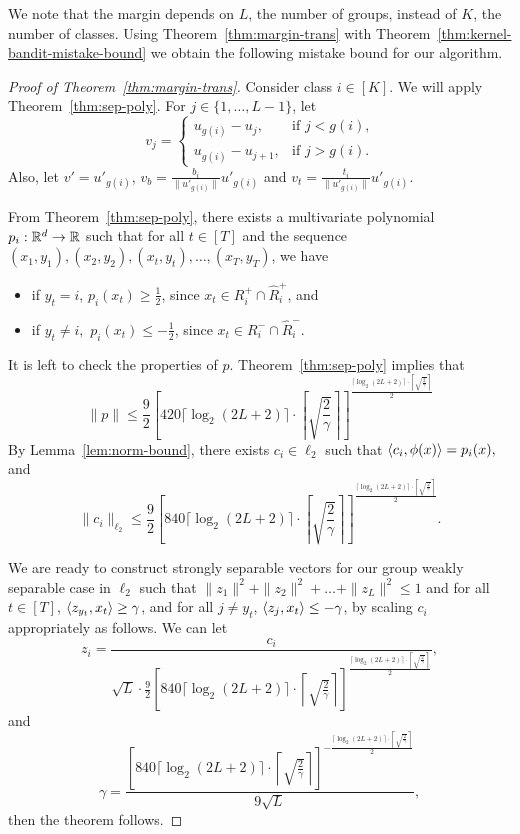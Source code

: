 We note that the margin depends on $L$, the number of groups, instead of $K$, the number of classes.  Using Theorem~\ref{thm:margin-trans} with Theorem~\ref{thm:kernel-bandit-mistake-bound} we obtain the following mistake bound for our algorithm.

\begin{proof}[Proof of Theorem~\ref{thm:margin-trans}]

Consider class $i\in[K]$. We will apply
Theorem~\ref{thm:sep-poly}. For $j\in\{1,\ldots,L-1\}$, let
\[
v_j=\left\{
\begin{array}{ll}
    u_{g(i)}-u_j, & \mbox{if $j<g(i)$,} \\
    u_{g(i)}-u_{j+1}, & \mbox{if $j>g(i)$.}
\end{array}
\right.    
\]
Also, let $v'=u'_{g(i)}$, $v_b=\frac{b_i}{\|u'_{g(i)}\|}u'_{g(i)}$
and $v_t=\frac{t_i}{\|u'_{g(i)}\|}u'_{g(i)}$.

From Theorem~\ref{thm:sep-poly}, there exists a multivariate
polynomial $p_i:{\mathbb{R}}^d\to {\mathbb{R}}$ such that for all $t\in[T]$ and the
sequence $(x_1,y_1),(x_2,y_2),(x_t,y_t),\ldots,(x_T,y_T)$, we have
\begin{itemize}
\item if $y_t=i$, $p_i(x_t)\geq \frac{1}{2}$, since $x_t\in R^{+}_i
    \cap \hat{R}^{+}_i$, and
\item if $y_t\neq i,$ $p_i(x_t)\leq -\frac{1}{2}$, since $x_t\in
    R^{-}_i \cap \hat{R}^{-}_i$.
\end{itemize}

It is left to check the properties of $p$.
Theorem~\ref{thm:sep-poly} implies that
\[
\|p\|\leq \frac{9}{2}\left[420\lceil\log_2(2L+2)\rceil\cdot\left\lceil\sqrt{\frac{2}{\gamma}}\right\rceil\right]^{\frac{\lceil\log_2(2L+2)\rceil\cdot\left\lceil\sqrt{\frac{2}{\gamma}}\right\rceil}{2}}
\]
By Lemma~\ref{lem:norm-bound}, there exists $c_i\in\ell_2$ such that $\langle c_i,\phi(x)\rangle=p_i(x),$ and
\[
\|c_i\|_{\ell_2}\leq \frac{9}{2}\left[840\lceil\log_2(2L+2)\rceil\cdot\left\lceil\sqrt{\frac{2}{\gamma}}\right\rceil\right]^{\frac{\lceil\log_2(2L+2)\rceil\cdot\left\lceil\sqrt{\frac{2}{\gamma}}\right\rceil}{2}}.
\]

We are ready to construct strongly separable vectors for our group
weakly separable case in $\ell_2$ such that
$\|z_1\|^2+\|z_2\|^2+\ldots+\|z_L\|^2\leq 1$ and for all $t\in [T]$,
$\langle z_{y_t},x_t\rangle \geq \gamma$, and for all $j\neq y_t$,
$\langle z_j,x_t\rangle\leq -\gamma$, by scaling $c_i$ appropriately as
follows.  We can let
\[
z_i=\frac{c_i}{\sqrt{L}\cdot \frac{9}{2}\left[840\lceil\log_2(2L+2)\rceil\cdot\left\lceil\sqrt{\frac{2}{\gamma}}\right\rceil\right]^{\frac{\lceil\log_2(2L+2)\rceil\cdot\left\lceil\sqrt{\frac{2}{\gamma}}\right\rceil}{2}}},
\]
and
\[
\gamma = \frac{\left[840\lceil\log_2(2L+2)\rceil\cdot\left\lceil\sqrt{\frac{2}{\gamma}}\right\rceil\right]^{-\frac{\lceil\log_2(2L+2)\rceil\cdot\left\lceil\sqrt{\frac{2}{\gamma}}\right\rceil}{2}}}{9\sqrt{L}},
\]
then the theorem follows.    
\end{proof}

